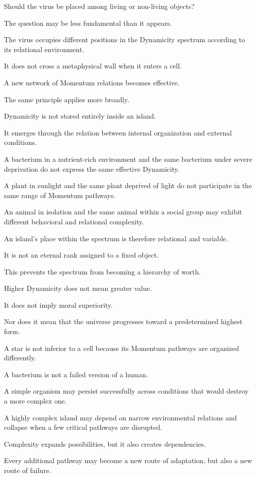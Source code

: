 Should the virus be placed among living or non-living objects?

The question may be less fundamental than it appears.

The virus occupies different positions in the Dynamicity spectrum according to its relational environment.

It does not cross a metaphysical wall when it enters a cell.

A new network of Momentum relations becomes effective.

The same principle applies more broadly.

Dynamicity is not stored entirely inside an island.

It emerges through the relation between internal organization and external conditions.

A bacterium in a nutrient-rich environment and the same bacterium under severe deprivation do not express the same effective Dynamicity.

A plant in sunlight and the same plant deprived of light do not participate in the same range of Momentum pathways.

An animal in isolation and the same animal within a social group may exhibit different behavioral and relational complexity.

An island’s place within the spectrum is therefore relational and variable.

It is not an eternal rank assigned to a fixed object.

This prevents the spectrum from becoming a hierarchy of worth.

Higher Dynamicity does not mean greater value.

It does not imply moral superiority.

Nor does it mean that the universe progresses toward a predetermined highest form.

A star is not inferior to a cell because its Momentum pathways are organized differently.

A bacterium is not a failed version of a human.

A simple organism may persist successfully across conditions that would destroy a more complex one.

A highly complex island may depend on narrow environmental relations and collapse when a few critical pathways are disrupted.

Complexity expands possibilities, but it also creates dependencies.

Every additional pathway may become a new route of adaptation, but also a new route of failure.

